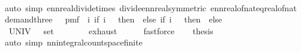 \begin{isabellebody}
%
\isadelimproof
\ \ %
\endisadelimproof
%
\isatagproof
{}\isamarkupfalse%
\ {\isacharparenleft}{\kern0pt}auto\ simp{\isacharcolon}{\kern0pt}\ ennreal{\isacharunderscore}{\kern0pt}divide{\isacharunderscore}{\kern0pt}times\ divide{\isacharunderscore}{\kern0pt}ennreal{\isacharbrackleft}{\kern0pt}symmetric{\isacharbrackright}{\kern0pt}\ ennreal{\isacharunderscore}{\kern0pt}of{\isacharunderscore}{\kern0pt}nat{\isacharunderscore}{\kern0pt}eq{\isacharunderscore}{\kern0pt}real{\isacharunderscore}{\kern0pt}of{\isacharunderscore}{\kern0pt}nat{\isacharparenright}{\kern0pt}%
\endisatagproof
{\isafoldproof}%
%
\isadelimproof
\isanewline
%
\endisadelimproof
\isanewline
{}\isamarkupfalse%
\ demand{\isacharunderscore}{\kern0pt}three\ {\isacharcolon}{\kern0pt}{\isacharcolon}{\kern0pt}\ {\isachardoublequoteopen}{}\ pmf{\isachardoublequoteclose}\ \ {\isachardoublequoteopen}{\isasymlambda}i{\isachardot}{\kern0pt}\ if\ i\ {\isacharequal}{\kern0pt}\ {}\ then\ {}{\isacharslash}{\kern0pt}{}\ else\ if\ i\ {\isacharequal}{\kern0pt}\ {}\ then\ {}{\isacharslash}{\kern0pt}{}\ else\ {}{\isacharslash}{\kern0pt}{}{\isachardoublequoteclose}\isanewline
%
\isadelimproof
%
\endisadelimproof
%
\isatagproof
{}\isamarkupfalse%
\ {\isacharminus}{\kern0pt}\isanewline
\ \ \isamarkupfalse%
\ {\isacharasterisk}{\kern0pt}{\isacharcolon}{\kern0pt}\ {\isachardoublequoteopen}{\isacharparenleft}{\kern0pt}UNIV\ {\isacharcolon}{\kern0pt}{\isacharcolon}{\kern0pt}\ {\isacharparenleft}{\kern0pt}{}\ set{\isacharparenright}{\kern0pt}{\isacharparenright}{\kern0pt}\ {\isacharequal}{\kern0pt}\ {\isacharbraceleft}{\kern0pt}{}{\isacharcomma}{\kern0pt}{}{\isacharcomma}{\kern0pt}{}{\isacharbraceright}{\kern0pt}{\isachardoublequoteclose}\isanewline
\ \ \ \ \isamarkupfalse%
\ exhaust{\isacharunderscore}{\kern0pt}{}\isanewline
\ \ \ \ \isamarkupfalse%
\ fastforce\isanewline
\ \ \isamarkupfalse%
\ {\isacharquery}{\kern0pt}thesis\isanewline
\ \ \ \ \isamarkupfalse%
\ {\isacharparenleft}{\kern0pt}auto\ simp{\isacharcolon}{\kern0pt}\ nn{\isacharunderscore}{\kern0pt}integral{\isacharunderscore}{\kern0pt}count{\isacharunderscore}{\kern0pt}space{\isacharunderscore}{\kern0pt}finite{\isacharparenright}{\kern0pt}\isanewline
\ \ \ \ \isamarkupfalse%
\ {\isacharasterisk}{\kern0pt}\isanewline

\end{isabellebody}
